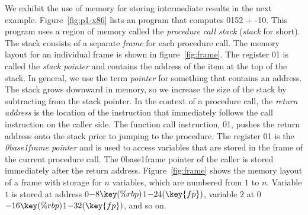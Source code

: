 \documentclass[7x10]{TimesAPriori_MIT}%
\def\racketEd{0}
\def\pythonEd{1}
\def\edition{1}
\def\xeightysixEd{0}
\def\riscvEd{1}
\def\architecture{1}
\newcommand\ifriscv[1]{\if\architecture\riscvEd{#1}\fi}
\newcommand\ifxeightsix[1]{\if\architecture\xeightysixEd{#1}\fi}
\newcommand{\racket}[1]{{\if\edition\racketEd{#1}\fi}}
\newcommand{\pythonColor}[0]{}
\newcommand{\python}[1]{{\if\edition\pythonEd\pythonColor #1\fi}}
\numberwithin{theorem}{chapter}
\numberwithin{definition}{chapter}
\numberwithin{equation}{chapter}
\begin{document}
We exhibit the use of memory for storing intermediate results in the
next example.  Figure~\ref{fig:p1-x86} lists an {\ArchName} program that
computes \racket{}\python{52 + -10}. This program
uses a region of memory called the \emph{procedure call stack}
(\emph{stack} for
short). 
The stack consists of a separate \emph{frame}
for each procedure call. The memory layout for an individual frame is
shown in figure~\ref{fig:frame}.  The register
\ifxeightsix{}\ifriscv{} is called the 
\emph{stack pointer} and contains the
address of the item at the top of the stack.  In general, we use the
term \emph{pointer} for something that
contains an address. The stack grows downward in memory, so we
increase the size of the stack by subtracting from the stack pointer.
In the context of a procedure call, the \emph{return
  address} is the location of the
instruction that immediately follows the call instruction on the
caller side.  The function call instruction,
\ifxeightsix{}\ifriscv{}, pushes the 
return address onto the stack prior to jumping to the procedure.  The
register \ifxeightsix{}\ifriscv{} is the \emph{\ifxeightsix{base}\ifriscv{frame} pointer} and is used to access variables that are stored in the
frame of the current procedure call.  The \ifxeightsix{base}\ifriscv{frame} pointer of the caller
is stored immediately after the return address.
Figure~\ref{fig:frame} shows the memory layout of a frame with storage
for $n$ variables, which are numbered from $1$ to $n$. Variable $1$ is
stored at address
\ifxeightsix{$-8\key{(\%rbp)}$}\ifriscv{$-24(\key{fp})$},
variable $2$ at
\ifxeightsix{$-16\key{(\%rbp)}$}\ifriscv{$-32(\key{fp})$}, and so on.
\end{document}
